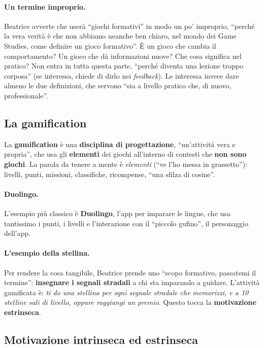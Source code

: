 \paragraph{Un termine improprio.} Beatrice avverte che userà ``giochi formativi'' in
modo un po' improprio, ``perché la vera verità è che non abbiamo neanche ben chiaro,
nel mondo dei Game Studies, come definire un gioco formativo''. È un gioco che cambia
il comportamento? Un gioco che dà informazioni nuove? Che cosa significa nel pratico?
Non entra in tutta questa parte, ``perché diventa una lezione troppo corposa'' (se
interessa, chiede di dirlo nei \emph{feedback}). Le interessa invece dare almeno le
due definizioni, che servono ``sia a livello pratico che, di nuovo, professionale''.

\subsection{La gamification}
\label{a9:sec:gamification}

La \textbf{gamification} è una \textbf{disciplina di progettazione}, ``un'attività
vera e propria'', che usa gli \textbf{elementi} dei giochi all'interno di contesti
che \textbf{non sono giochi}. La parola da tenere a mente è \emph{elementi} (``ve
l'ho messa in grassetto''): livelli, punti, missioni, classifiche, ricompense, ``una
sfilza di cosine''.

\paragraph{Duolingo.} L'esempio più classico è \textbf{Duolingo}, l'app per imparare le
lingue, che usa tantissimo i punti, i livelli e l'interazione con il ``piccolo
gufino'', il personaggio dell'app.

\paragraph{L'esempio della stellina.} Per rendere la cosa tangibile, Beatrice prende
uno ``scopo formativo, passatemi il termine'': \textbf{insegnare i segnali stradali} a
chi sta imparando a guidare. L'attività gamificata è: \emph{ti do una stellina per ogni
segnale stradale che memorizzi, e a 10 stelline sali di livello, oppure raggiungi un
premio}. Questo tocca la \textbf{motivazione estrinseca}.

\subsection{Motivazione intrinseca ed estrinseca}
\label{a9:sec:motivazione}

